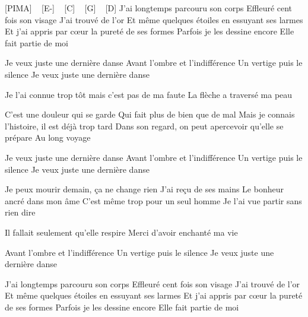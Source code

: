 [PIMA] ~
[E-] ~ [C] ~ [G] ~ [D]
J'ai longtemps parcouru son corps
Effleuré cent fois son visage
J'ai trouvé de l'or
Et même quelques étoiles en essuyant ses larmes
Et j'ai appris par cœur la pureté de ses formes
Parfois je les dessine encore
Elle fait partie de moi

Je veux juste une dernière danse
Avant l'ombre et l'indifférence
Un vertige puis le silence
Je veux juste une dernière danse

Je l'ai connue trop tôt mais c'est pas de ma faute
La flèche a traversé ma peau

C'est une douleur qui se garde
Qui fait plus de bien que de mal
Mais je connais l'histoire, il est déjà trop tard
Dans son regard, on peut apercevoir qu'elle se prépare
Au long voyage

Je veux juste une dernière danse
Avant l'ombre et l'indifférence
Un vertige puis le silence
Je veux juste une dernière danse

Je peux mourir demain, ça ne change rien
J'ai reçu de ses mains
Le bonheur ancré dans mon âme
C'est même trop pour un seul homme
Je l'ai vue partir sans rien dire

Il fallait seulement qu'elle respire
Merci d'avoir enchanté ma vie

Avant l'ombre et l'indifférence
Un vertige puis le silence
Je veux juste une dernière danse

J'ai longtemps parcouru son corps
Effleuré cent fois son visage
J'ai trouvé de l'or
Et même quelques étoiles en essuyant ses larmes
Et j'ai appris par cœur la pureté de ses formes
Parfois je les dessine encore
Elle fait partie de moi

